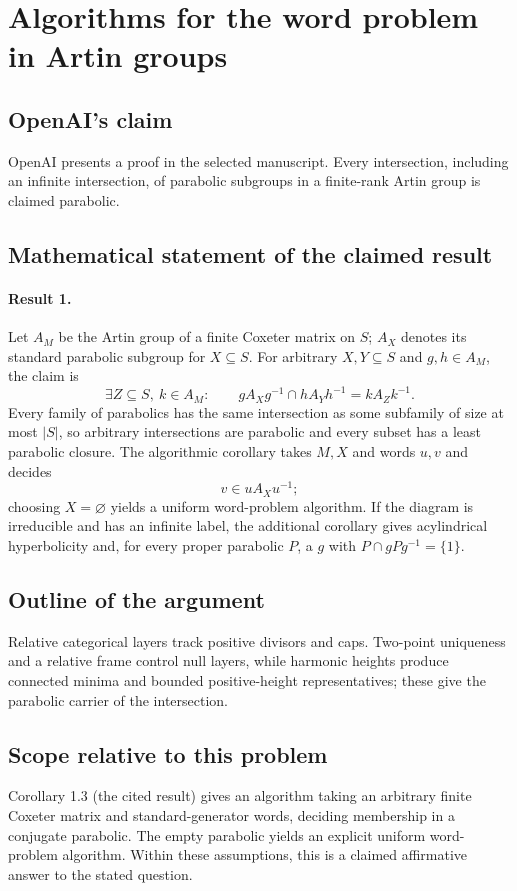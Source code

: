 \documentclass[11pt]{article}
\begin{document}
\section*{Algorithms for the word problem in Artin groups}

\subsection{OpenAI's claim}
OpenAI presents a proof in the selected manuscript. Every intersection, including an infinite intersection, of parabolic subgroups in a finite-rank Artin group is claimed parabolic.

\subsection{Mathematical statement of the claimed result}
\paragraph{Result 1.} Let \(A_M\) be the Artin group of a finite Coxeter matrix on \(S\); \(A_X\) denotes its standard parabolic subgroup for \(X\subseteq S\). For arbitrary \(X,Y\subseteq S\) and \(g,h\in A_M\), the claim is
\[
 \exists Z\subseteq S,\ k\in A_M:\qquad
 gA_Xg^{-1}\cap hA_Yh^{-1}=kA_Zk^{-1}.
\]
Every family of parabolics has the same intersection as some subfamily of size at most \(|S|\), so arbitrary intersections are parabolic and every subset has a least parabolic closure. The algorithmic corollary takes \(M,X\) and words \(u,v\) and decides
\[
 v\in uA_Xu^{-1};
\]
choosing \(X=\varnothing\) yields a uniform word-problem algorithm. If the diagram is irreducible and has an infinite label, the additional corollary gives acylindrical hyperbolicity and, for every proper parabolic \(P\), a \(g\) with \(P\cap gPg^{-1}=\{1\}\).

\subsection{Outline of the argument}
Relative categorical layers track positive divisors and caps. Two-point uniqueness and a relative frame control null layers, while harmonic heights produce connected minima and bounded positive-height representatives; these give the parabolic carrier of the intersection.

\subsection{Scope relative to this problem}
Corollary 1.3 (the cited result) gives an algorithm taking an arbitrary finite Coxeter matrix and standard-generator words, deciding membership in a conjugate parabolic. The empty parabolic yields an explicit uniform word-problem algorithm. Within these assumptions, this is a claimed affirmative answer to the stated question.
\end{document}
